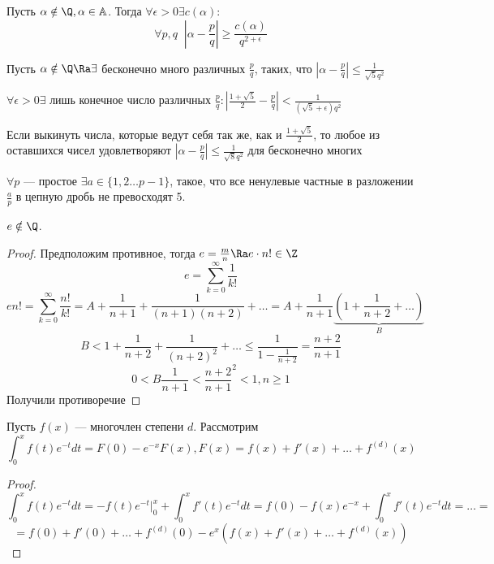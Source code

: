 
\begin{theorem}[Roth]
    Пусть \(\alpha \notin \Q, \alpha \in \mathbb{A}\). Тогда \(\forall \epsilon > 0 \exists c(\alpha):\)
    \[\forall p, q\;\;\left|\alpha - \frac{p}{q}\right| \ge \frac{c(\alpha)}{q^{2 + \epsilon}}\]
\end{theorem}

\begin{theorem}
    Пусть \(\alpha \notin \Q \Ra \exists\) бесконечно много различных \(\frac{p}{q}\), таких, что \(\left|\alpha - \frac{p}{q}\right| \le \frac{1}{\sqrt{5}q^2}\)
\end{theorem}

\begin{theorem}
    \(\forall \epsilon > 0 \exists\) лишь конечное число различных \(\frac{p}{q}: \left|\frac{1 + \sqrt{5}}{2} - \frac{p}{q}\right| < \frac{1}{(\sqrt{5} + \epsilon)q^2}\)
\end{theorem}

\begin{theorem}
    Если выкинуть числа, которые ведут себя так же, как и \(\frac{1 + \sqrt{5}}{2}\), то любое из оставшихся чисел удовлетворяют \(\left|\alpha - \frac{p}{q}\right| \le \frac{1}{\sqrt{8}q^2}\) для бесконечно многих 
\end{theorem}

\begin{proposition}
    \(\forall p\) --- простое \(\exists a \in \{1, 2 \dots p - 1\}\), такое, что все ненулевые частные в разложении \(\frac{a}{p}\) в цепную дробь не превосходят 5.
\end{proposition}

\begin{theorem}
    \(e \notin \Q\).
\end{theorem}
\begin{proof}
    Предположим противное, тогда \(e = \frac{m}{n} \Ra e\cdot n! \in \Z\)
    \[e = \sum_{k = 0}^\infty \frac{1}{k!}\]
    \[en! = \sum_{k = 0}^\infty \frac{n!}{k!} = A + \frac{1}{n + 1} + \frac{1}{(n + 1)(n + 2)} + \dots = A + \frac{1}{n + 1}\underbrace{\left(1 + \frac{1}{n + 2} + \dots \right)}_{B}\]
    \[B < 1 + \frac{1}{n + 2} + \frac{1}{(n + 2)^2} + \dots \le \frac{1}{1 - \frac{1}{n + 2}} = \frac{n + 2}{n + 1}\]
    \[0 < B \frac{1}{n + 1} < \frac{n + 2}{n + 1}^2 < 1, n \ge 1\]
    Получили противоречие
\end{proof}

\begin{proposition}
    Пусть \(f(x)\) --- многочлен степени \(d\).
    Рассмотрим
    \[\int_0^x f(t)e^{-t}dt = F(0) - e^{-x}F(x), F(x) = f(x) + f'(x) + \dots + f^{(d)}(x)\]
\end{proposition}
\begin{proof}
    \[\int_0^x f(t)e^{-t}dt = -f(t)e^{-t}|_0^x + \int_0^x f'(t)e^{-t}dt = f(0) - f(x)e^{-x} + \int_0^x f'(t)e^{-t}dt = \dots = \]
    \[= f(0) + f'(0) + \dots + f^{(d)}(0) - e^x(f(x) + f'(x) + \dots + f^{(d)}(x))\]
\end{proof}

